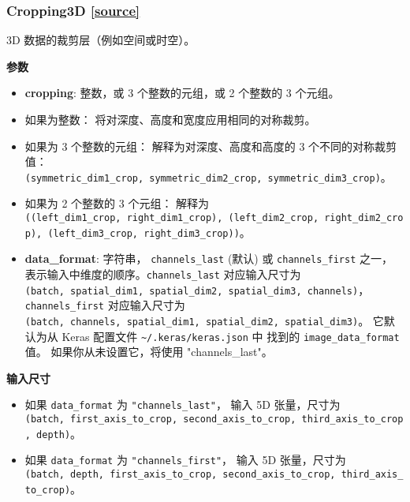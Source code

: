 \subsubsection{Cropping3D {\href{https://github.com/keras-team/keras/blob/master/keras/layers/convolutional.py\#L2150}{{[}source{]}}}}

\begin{Shaded}
\begin{Highlighting}[]
\OperatorTok{=}\NormalTok{((}\NormalTok{, }\NormalTok{), (}\NormalTok{, }\NormalTok{), (}\NormalTok{, }\OperatorTok{=}\NormalTok{)}
\end{Highlighting}
\end{Shaded}

3D 数据的裁剪层（例如空间或时空）。

\textbf{参数}

\begin{itemize}
\tightlist
\item
  \textbf{cropping}: 整数，或 3 个整数的元组，或 2 个整数的 3 个元组。
\item
  如果为整数： 将对深度、高度和宽度应用相同的对称裁剪。
\item
  如果为 3 个整数的元组： 解释为对深度、高度和高度的 3
  个不同的对称裁剪值：
  \texttt{(symmetric\_dim1\_crop,\ symmetric\_dim2\_crop,\ symmetric\_dim3\_crop)}。
\item
  如果为 2 个整数的 3 个元组： 解释为
  \texttt{((left\_dim1\_crop,\ right\_dim1\_crop),\ (left\_dim2\_crop,\ right\_dim2\_crop),\ (left\_dim3\_crop,\ right\_dim3\_crop))}。
\item
  \textbf{data\_format}: 字符串， \texttt{channels\_last} (默认) 或
  \texttt{channels\_first} 之一，
  表示输入中维度的顺序。\texttt{channels\_last} 对应输入尺寸为
  \texttt{(batch,\ spatial\_dim1,\ spatial\_dim2,\ spatial\_dim3,\ channels)}，
  \texttt{channels\_first} 对应输入尺寸为
  \texttt{(batch,\ channels,\ spatial\_dim1,\ spatial\_dim2,\ spatial\_dim3)}。
  它默认为从 Keras 配置文件 \texttt{\textasciitilde{}/.keras/keras.json}
  中 找到的 \texttt{image\_data\_format} 值。 如果你从未设置它，将使用
  "channels\_last"。
\end{itemize}

\textbf{输入尺寸}

\begin{itemize}
\tightlist
\item
  如果 \texttt{data\_format} 为 \texttt{"channels\_last"}， 输入 5D
  张量，尺寸为
  \texttt{(batch,\ first\_axis\_to\_crop,\ second\_axis\_to\_crop,\ third\_axis\_to\_crop,\ depth)}。
\item
  如果 \texttt{data\_format} 为 \texttt{"channels\_first"}， 输入 5D
  张量，尺寸为
  \texttt{(batch,\ depth,\ first\_axis\_to\_crop,\ second\_axis\_to\_crop,\ third\_axis\_to\_crop)}。
\end{itemize}

